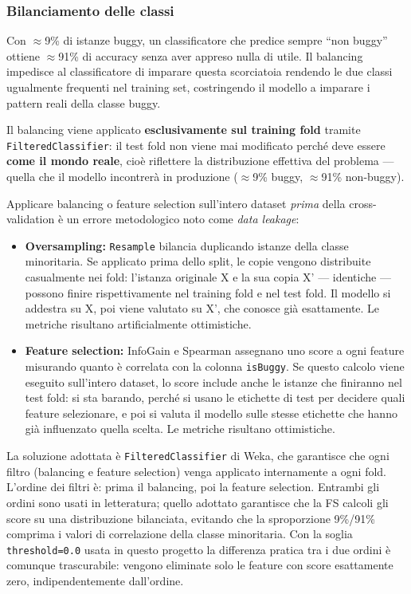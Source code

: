 \subsubsection{Bilanciamento delle classi}

Con $\approx$9\% di istanze buggy, un classificatore che predice sempre ``non buggy''
ottiene $\approx$91\% di accuracy senza aver appreso nulla di utile. Il balancing
impedisce al classificatore di imparare questa scorciatoia rendendo le due classi
ugualmente frequenti nel training set, costringendo il modello a imparare i pattern reali
della classe buggy.

Il balancing viene applicato \textbf{esclusivamente sul training fold} tramite
\texttt{FilteredClassifier}: il test fold non viene mai modificato perché deve essere
\textbf{come il mondo reale}, cioè riflettere la distribuzione effettiva del problema
--- quella che il modello incontrerà in produzione ($\approx$9\% buggy, $\approx$91\%
non-buggy).

Applicare balancing o feature selection sull'intero dataset \emph{prima} della
cross-validation è un errore metodologico noto come \textit{data leakage}:

\begin{itemize}
\item \textbf{Oversampling:} \texttt{Resample} bilancia duplicando istanze della classe
minoritaria. Se applicato prima dello split, le copie vengono distribuite casualmente
nei fold: l'istanza originale X e la sua copia X' --- identiche --- possono finire
rispettivamente nel training fold e nel test fold. Il modello si addestra su X, poi
viene valutato su X', che conosce già esattamente. Le metriche risultano
artificialmente ottimistiche.

\item \textbf{Feature selection:} InfoGain e Spearman assegnano uno score a ogni feature
misurando quanto è correlata con la colonna \texttt{isBuggy}. Se questo calcolo viene
eseguito sull'intero dataset, lo score include anche le istanze che finiranno nel test
fold: si sta barando, perché si usano le etichette di test per decidere quali feature
selezionare, e poi si valuta il modello sulle stesse etichette che hanno già influenzato
quella scelta. Le metriche risultano ottimistiche.
\end{itemize}

La soluzione adottata è \texttt{FilteredClassifier} di Weka, che garantisce che ogni
filtro (balancing e feature selection) venga applicato internamente a ogni fold.
L'ordine dei filtri è: prima il balancing, poi la feature selection. Entrambi gli
ordini sono usati in letteratura; quello adottato garantisce che la FS calcoli gli
score su una distribuzione bilanciata, evitando che la sproporzione 9\%/91\% comprima
i valori di correlazione della classe minoritaria. Con la soglia \texttt{threshold=0.0}
usata in questo progetto la differenza pratica tra i due ordini è comunque trascurabile:
vengono eliminate solo le feature con score esattamente zero, indipendentemente dall'ordine.

